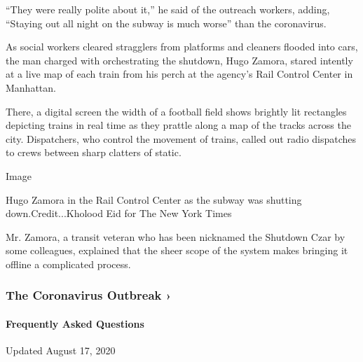 ``They were really polite about it,'' he said of the outreach workers,
adding, ``Staying out all night on the subway is much worse'' than the
coronavirus.

As social workers cleared stragglers from platforms and cleaners flooded
into cars, the man charged with orchestrating the shutdown, Hugo Zamora,
stared intently at a live map of each train from his perch at the
agency's Rail Control Center in Manhattan.

There, a digital screen the width of a football field shows brightly lit
rectangles depicting trains in real time as they prattle along a map of
the tracks across the city. Dispatchers, who control the movement of
trains, called out radio dispatches to crews between sharp clatters of
static.

Image

Hugo Zamora in the Rail Control Center as the subway was shutting
down.Credit...Kholood Eid for The New York Times

Mr. Zamora, a transit veteran who has been nicknamed the Shutdown Czar
by some colleagues, explained that the sheer scope of the system makes
bringing it offline a complicated process.

\href{https://www.nytimes3xbfgragh.onion/news-event/coronavirus?action=click\&pgtype=Article\&state=default\&region=MAIN_CONTENT_3\&context=storylines_faq}{}

\hypertarget{the-coronavirus-outbreak-}{%
\subsubsection{The Coronavirus Outbreak
›}\label{the-coronavirus-outbreak-}}

\hypertarget{frequently-asked-questions}{%
\paragraph{Frequently Asked
Questions}\label{frequently-asked-questions}}

Updated August 17, 2020

